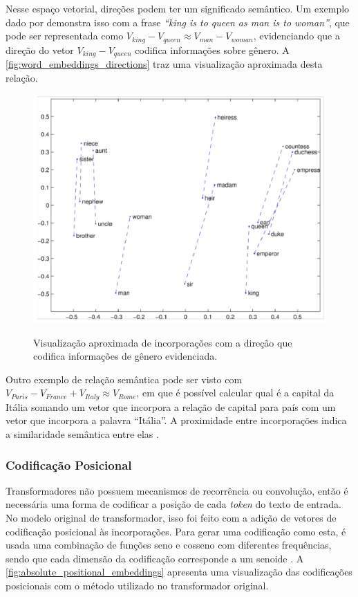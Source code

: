 Nesse espaço vetorial, direções podem ter um significado semântico. Um exemplo dado por \textcite{glove} demonstra isso
com a frase \textit{``king is to queen as man is to woman''}, que pode ser representada como
\begin{math}V_{king} - V_{queen} \approx V_{man} - V_{woman}\end{math}, evidenciando que a direção do vetor
\begin{math}V_{king} - V_{queen}\end{math} codifica informações sobre gênero. A \autoref{fig:word_embeddings_directions}
traz uma visualização aproximada desta relação.

\begin{figure}[ht]
    \centering
    \caption{\small Visualização aproximada de incorporações com a direção que codifica informações de gênero evidenciada.}
    \includegraphics[width=0.6\columnwidth,keepaspectratio]{images/word_embeddings_directions.png}
    \label{fig:word_embeddings_directions}
\end{figure}

Outro exemplo de relação semântica pode ser visto com \begin{math}V_{Paris} - V_{France} + V_{Italy} \approx V_{Rome}\end{math},
em que é possível calcular qual é a capital da Itália somando um vetor que incorpora a relação de capital para país com um vetor
que incorpora a palavra ``Itália''. A proximidade entre incorporações indica
a similaridade semântica entre elas \cite{word2vec_estimation}.

\subsubsection{Codificação Posicional}

Transformadores não possuem mecanismos de recorrência ou convolução, então é necessária uma forma de codificar a
posição de cada \textit{token} do texto de entrada. No modelo original de transformador, isso foi feito com a adição de
vetores de codificação posicional às incorporações. Para gerar uma codificação como esta, é usada uma combinação de
funções seno e cosseno com diferentes frequências, sendo que cada dimensão da codificação corresponde a um senoide
\cite{transformer}. A \autoref{fig:absolute_positional_embeddings} apresenta uma visualização das codificações
posicionais com o método utilizado no transformador original.

